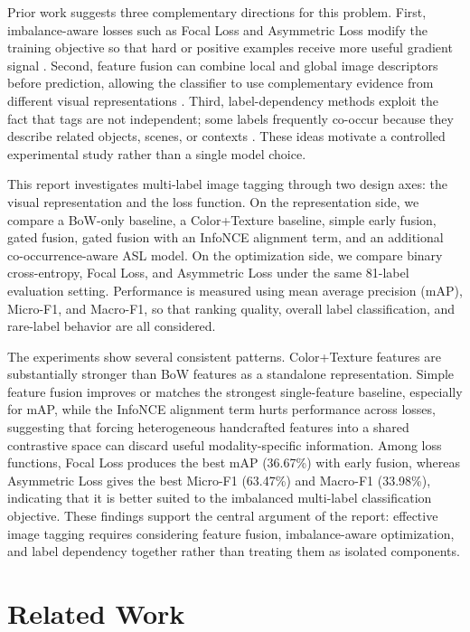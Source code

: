 \documentclass[10pt,journal,compsoc]{IEEEtran}
\begin{document}
Prior work suggests three complementary directions for this problem. First,
imbalance-aware losses such as Focal Loss and Asymmetric Loss modify the
training objective so that hard or positive examples receive more useful
gradient signal \cite{wang2022survey,ridnik2021asymmetric}. Second, feature
fusion can combine local and global image descriptors before prediction,
allowing the classifier to use complementary evidence from different visual
representations \cite{baltrusaitis2018multimodal,meng2020survey,gao2020survey}.
Third, label-dependency methods exploit the fact that tags are not
independent; some labels frequently co-occur because they describe related
objects, scenes, or contexts \cite{chen2019multi,rawlekar2024improving}. These
ideas motivate a controlled experimental study rather than a single model
choice.

This report investigates multi-label image tagging through two design axes:
the visual representation and the loss function. On the representation side,
we compare a BoW-only baseline, a Color+Texture baseline, simple early fusion,
gated fusion, gated fusion with an InfoNCE alignment term, and an additional
co-occurrence-aware ASL model. On the optimization side, we compare binary
cross-entropy, Focal Loss, and Asymmetric Loss under the same 81-label
evaluation setting. Performance is measured using mean average precision
(mAP), Micro-F1, and Macro-F1, so that ranking quality, overall label
classification, and rare-label behavior are all considered.

The experiments show several consistent patterns. Color+Texture features are
substantially stronger than BoW features as a standalone representation.
Simple feature fusion improves or matches the strongest single-feature
baseline, especially for mAP, while the InfoNCE alignment term hurts
performance across losses, suggesting that forcing heterogeneous handcrafted
features into a shared contrastive space can discard useful modality-specific
information. Among loss functions, Focal Loss produces the best mAP
(36.67\%) with early fusion, whereas Asymmetric Loss gives the best Micro-F1
(63.47\%) and Macro-F1 (33.98\%), indicating that it is better suited to the
imbalanced multi-label classification objective. These findings support the
central argument of the report: effective image tagging requires considering
feature fusion, imbalance-aware optimization, and label dependency together
rather than treating them as isolated components.

\section{Related Work}
\end{document}
